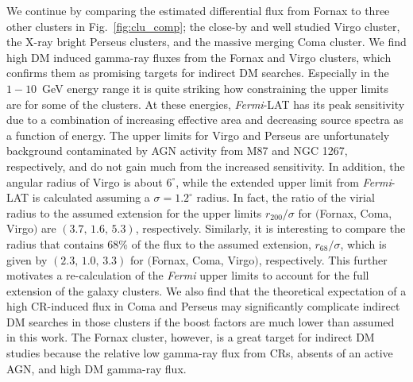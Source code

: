 \documentclass[10pt,aps,pra,reprint,amsmath,amsfonts,amssymb,showpacs,nofootinbib,floatfix]{revtex4-1}
\newcommand{\Fermi}{{\em Fermi}\xspace}
\newcommand{\rvir}{r_{200}}
\begin{document}
We continue by comparing the estimated differential flux from Fornax
to three other clusters in Fig.~\ref{fig:clu_comp}; the close-by and
well studied Virgo cluster, the X-ray bright Perseus clusters, and the
massive merging Coma cluster. We find high DM induced gamma-ray fluxes
from the Fornax and Virgo clusters, which confirms them as promising
targets for indirect DM searches. Especially in the $1-10$~GeV energy
range it is quite striking how constraining the upper limits are for
some of the clusters. At these energies, \Fermi-LAT has its peak
sensitivity due to a combination of increasing effective area and
decreasing source spectra as a function of energy. The upper limits
for Virgo and Perseus are unfortunately background contaminated by AGN
activity from M87 and NGC 1267, respectively, and do not gain much
from the increased sensitivity. In addition, the angular radius of
Virgo is about $6^\circ$, while the extended upper limit from
\Fermi-LAT is calculated assuming a $\sigma=1.2^\circ$ radius. In
fact, the ratio of the virial radius to the assumed extension for the
upper limits $\rvir/\sigma$ for $($Fornax, Coma, Virgo$)$ are
$(3.7,\,1.6,\,5.3)$, respectively. Similarly, it is interesting to
compare the radius that contains 68\% of the flux to the assumed
extension, $r_{68}/\sigma$, which is given by $(2.3,\,1.0,\,3.3)$ for
$($Fornax, Coma, Virgo$)$, respectively. This further motivates a
re-calculation of the \Fermi upper limits to account for the full
extension of the galaxy clusters. We also find that the theoretical
expectation of a high CR-induced flux in Coma and Perseus may
significantly complicate indirect DM searches in those clusters if the
boost factors are much lower than assumed in this work. The Fornax
cluster, however, is a great target for indirect DM studies because
the relative low gamma-ray flux from CRs, absents of an active AGN,
and high DM gamma-ray flux.
\end{document}
